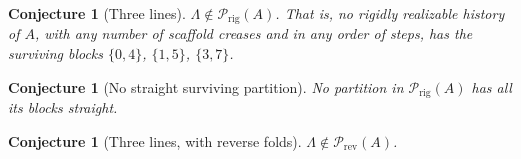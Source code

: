 \documentclass[11pt]{amsart}
\newtheorem{conjecture}[theorem]{Conjecture}
\theoremstyle{definition}
\theoremstyle{remark}
\newcommand{\Prig}{\mathcal{P}_{\mathrm{rig}}}
\newcommand{\Prev}{\mathcal{P}_{\mathrm{rev}}}
\begin{document}
\begin{conjecture}[Three lines]\label{conj:lines}
$\Lambda\notin\Prig(A)$. That is, no rigidly realizable history of $A$, with any number of
scaffold creases and in any order of steps, has the surviving blocks $\{0,4\}$, $\{1,5\}$,
$\{3,7\}$.
\end{conjecture}

\begin{conjecture}[No straight surviving partition]\label{conj:straight}
No partition in $\Prig(A)$ has all its blocks straight.
\end{conjecture}

\begin{conjecture}[Three lines, with reverse folds]\label{conj:linesrev}
$\Lambda\notin\Prev(A)$.
\end{conjecture}
\end{document}
